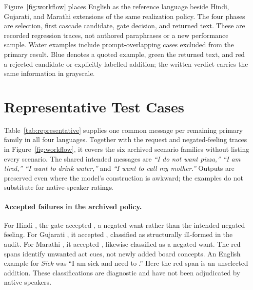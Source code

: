 Figure~\ref{fig:workflow} places English as the reference language beside Hindi, Gujarati, and Marathi extensions of the same realization policy.
The four phases are selection, first cascade candidate, gate decision, and returned text.
These are recorded regression traces, not authored paraphrases or a new performance sample.
Water examples include prompt-overlapping cases excluded from the primary result.
Blue denotes a quoted example, green the returned text, and red a rejected candidate or explicitly labelled addition; the written verdict carries the same information in grayscale.


\section{Representative Test Cases}
\label{app:cases}
Table~\ref{tab:representative} supplies one common message per remaining primary family in all four languages.
Together with the request and negated-feeling traces in Figure~\ref{fig:workflow}, it covers the six archived scenario families without listing every scenario.
The shared intended messages are \emph{“I do not want pizza,” “I am tired,” “I want to drink water,”} and \emph{“I want to call my mother.”}
Outputs are preserved even where the model's construction is awkward; the examples do not substitute for native-speaker ratings.

\begin{table}[t]
\centering

\caption{Representative recorded regression inputs and outputs. M: accepted model text; T: checked template after rejection. Blue marks quotations, not a naturalness judgment. In particular, accepted Hindi action/call and Marathi feeling outputs illustrate why lexical success needs independent language assessment. All four languages use the same decision policy.}
\label{tab:representative}
\end{table}

\paragraph{Accepted failures in the archived policy.}
For Hindi , the gate accepted , a negated want rather than the intended negated feeling.
For Gujarati , it accepted , classified as structurally ill-formed in the audit.
For Marathi , it accepted , likewise classified as a negated want.
The red spans identify unwanted act cues, not newly added board concepts.
An English example for \emph{Sick} was “I am sick and need to .”
Here the red span is an unselected addition.
These classifications are diagnostic and have not been adjudicated by native speakers.

